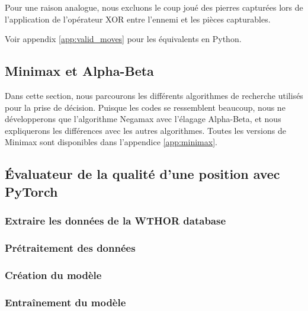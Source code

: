Pour une raison analogue, nous excluons le coup joué des pierres capturées lors de l'application de l'opérateur XOR entre l'ennemi et les pièces capturables.

Voir appendix \ref{app:valid_moves} pour les équivalents en Python.

\subsection{Minimax et Alpha-Beta}
\label{subsec:minimax}
Dans cette section, nous parcourons les différents algorithmes de recherche utilisés pour la prise de décision. Puisque les codes se ressemblent beaucoup, nous ne développerons que l'algorithme Negamax avec l'élagage Alpha-Beta, et nous expliquerons les différences avec les autres algorithmes. Toutes les versions de Minimax sont disponibles dans l'appendice \ref{app:minimax}.


\subsection{Évaluateur de la qualité d'une position avec PyTorch}
\label{subsec:eval}

\subsubsection{Extraire les données de la WTHOR database}
\label{subsubsec:wthor}

\subsubsection{Prétraitement des données}
\label{subsubsec:preproc}

\subsubsection{Création du modèle}
\label{subsubsec:model}

\subsubsection{Entraînement du modèle}
\label{subsubsec:train}

